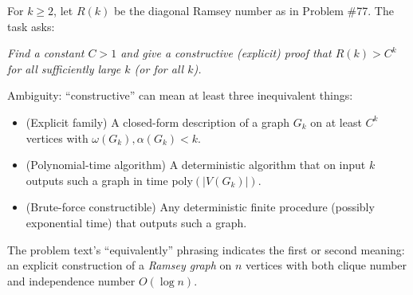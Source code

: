 For $k\ge 2$, let $R(k)$ be the diagonal Ramsey number as in Problem \#77. The task asks:

\emph{Find a constant $C>1$ and give a constructive (explicit) proof that $R(k)>C^k$ for all sufficiently large $k$ (or for all $k$).}

Ambiguity: ``constructive'' can mean at least three inequivalent things:
\begin{itemize}
\item (Explicit family) A closed-form description of a graph $G_k$ on at least $C^k$ vertices with $\omega(G_k),\alpha(G_k)<k$.
\item (Polynomial-time algorithm) A deterministic algorithm that on input $k$ outputs such a graph in time poly$(|V(G_k)|)$.
\item (Brute-force constructible) Any deterministic finite procedure (possibly exponential time) that outputs such a graph.
\end{itemize}
The problem text's ``equivalently'' phrasing indicates the first or second meaning: an explicit construction of a \emph{Ramsey graph} on $n$ vertices with both clique number and independence number $O(\log n)$.
